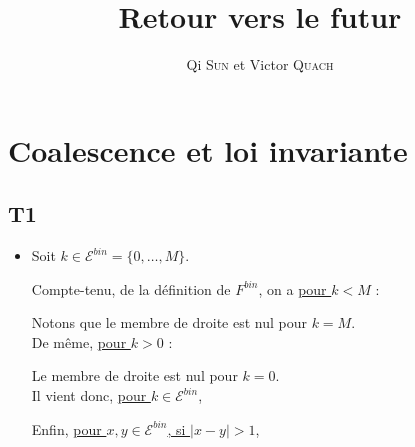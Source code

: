 \documentclass[a4paper,11pt]{article}
\title{Retour vers le futur}
\author{Qi \textsc{Sun} et Victor \textsc{Quach}}
\date{}
\def \E{\mathcal{E}}
\begin{document}
\maketitle

\section{Coalescence et loi invariante}

\subsection*{T1}

\begin{itemize}
\item[\textbullet]
Soit $k \in \E^{bin}=\{0, \dots, M\}$. 

Compte-tenu, de la définition de $F^{bin}$, on a \underline{pour $k<M$} :


\begin{center}
\end{center}

Notons que le membre de droite est nul pour $k=M$.\\


De même, \underline{pour $k>0$} : 
\begin{center}
\end{center}
Le membre de droite est nul pour $k=0$.\\


Il vient donc, \underline{pour $k \in \E^{bin}$},
\begin{center}
\end{center}

\vspace{5mm}
Enfin, \underline{pour $x,y \in \E^{bin}$, si $|x-y|>1$},
\begin{center}
\end{center}
\vspace{5mm}




\end{itemize}
\end{document}
